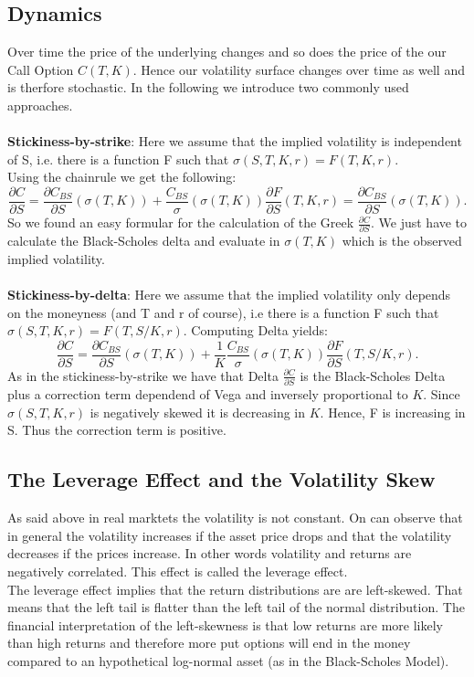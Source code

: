 \documentclass[12pt]{article}
\newcommand{\C}{C_{BS}}
\begin{document}
\subsection{Dynamics}
Over time the price of the underlying changes and so does the price of the our Call Option $C(T,K)$. Hence our volatility surface changes over time as well and is therfore stochastic. In the following we introduce two commonly used approaches.\\\\
\textbf{Stickiness-by-strike}: Here we assume that the implied volatility is independent of S, i.e. there is a function F such that $\sigma(S,T,K,r)=F(T,K,r)$.\\
Using the chainrule we get the following:
$$\frac{\partial C}{\partial S}=\frac{\partial\C}{\partial S}(\sigma(T,K))+\frac{\C}{\sigma}(\sigma(T,K))\frac{\partial F}{\partial S}(T,K,r)=\frac{\partial\C}{\partial S}(\sigma(T,K)).$$
So we found an easy formular for the calculation of the Greek $\frac{\partial C}{\partial S}$. We just have to calculate the Black-Scholes delta and evaluate in $\sigma(T,K)$ which is the observed implied volatility. \\\\
\textbf{Stickiness-by-delta}: Here we assume that the implied volatility only depends on the moneyness (and T and r of course), i.e there is a function F such that $\sigma(S,T,K,r)=F(T,S/K,r)$. Computing Delta yields:
$$\frac{\partial C}{\partial S}=\frac{\partial\C}{\partial S}(\sigma(T,K))+\frac{1}{K}\frac{\C}{\sigma}(\sigma(T,K))\frac{\partial F}{\partial S}(T,S/K,r) .$$
As in the stickiness-by-strike we have that Delta $\frac{\partial C}{\partial S}$ is the Black-Scholes Delta plus a correction term dependend of Vega and inversely proportional to $K$. Since $\sigma(S,T,K,r)$ is negatively skewed it is decreasing in $K$. Hence, F is increasing in S. Thus the correction term is positive.\\

\subsection{The Leverage Effect and the Volatility Skew}
As said above in real marktets the volatility is not constant. On can observe that in general the volatility increases if the asset price drops and that the volatility decreases if the prices increase. In other words volatility and returns are negatively correlated. This effect is called the leverage effect.\\
The leverage effect implies that the return distributions are are left-skewed. That means that the left tail is flatter than the left tail of the normal distribution. The financial interpretation of the left-skewness is that low returns are more likely than high returns and therefore more put options will end in the money compared to an hypothetical log-normal asset (as in the Black-Scholes Model).
\end{document}
